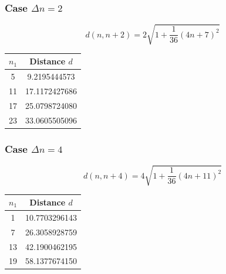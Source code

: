 \noindent
\begin{minipage}[t]{0.48\textwidth}

\subsubsection{Case $\Delta n = 2$}

\begin{equation}
d(n, n+2) = 2\sqrt{1 + \frac{1}{36}(4n + 7)^2}
\end{equation}

\begin{example}[Numerical values for $\Delta n = 2$]
\begin{table}[H]
\centering
\begin{tabular}{cc}
\toprule
$n_1$ & Distance $d$ \\
\midrule
5  & 9.2195444573  \\
11 & 17.1172427686 \\
17 & 25.0798724080 \\
23 & 33.0605505096 \\
\bottomrule
\end{tabular}
\end{table}
\end{example}

\end{minipage}
\hfill
\begin{minipage}[t]{0.48\textwidth}

\subsubsection{Case $\Delta n = 4$}

\begin{equation}
d(n, n+4) = 4\sqrt{1 + \frac{1}{36}(4n + 11)^2}
\end{equation}

\begin{example}[Numerical values for $\Delta n = 4$]
\begin{table}[H]
\centering
\begin{tabular}{cc}
\toprule
$n_1$ & Distance $d$ \\
\midrule
1  & 10.7703296143 \\
7  & 26.3058928759 \\
13 & 42.1900462195 \\
19 & 58.1377674150 \\
\bottomrule
\end{tabular}
\end{table}
\end{example}

\end{minipage}

